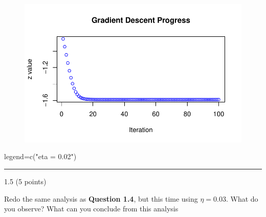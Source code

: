 \documentclass[
  letterpaper,
  DIV=11,
  numbers=noendperiod]{scrartcl}
\newenvironment{Shaded}{\begin{snugshade}}{\end{snugshade}}
\newcommand{\FunctionTok}[1]{\textcolor[rgb]{0.28,0.35,0.67}{#1}}
\newcommand{\NormalTok}[1]{\textcolor[rgb]{0.00,0.23,0.31}{#1}}
\newcommand{\OtherTok}[1]{\textcolor[rgb]{0.00,0.23,0.31}{#1}}
\newcommand{\StringTok}[1]{\textcolor[rgb]{0.13,0.47,0.30}{#1}}
\begin{document}
\begin{figure}[H]

{\centering \includegraphics{hm4_files/figure-pdf/unnamed-chunk-8-1.pdf}

}

\end{figure}

\begin{Shaded}
\begin{Highlighting}[]
\NormalTok{legend}\OtherTok{=}\FunctionTok{c}\NormalTok{(}\StringTok{"eta = 0.02"}\NormalTok{)}
\end{Highlighting}
\end{Shaded}

\begin{center}\rule{0.5\linewidth}{0.5pt}\end{center}

1.5 (5 points)

Redo the same analysis as \textbf{Question 1.4}, but this time using
\(\eta = 0.03\). What do you observe? What can you conclude from this
analysis
\end{document}
